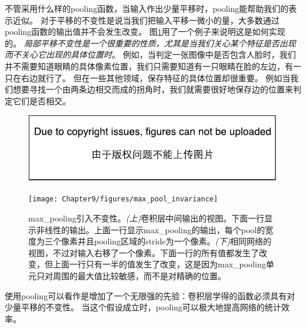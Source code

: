 不管采用什么样的\gls{pooling}函数，当输入作出少量平移时，\gls{pooling}能帮助我们的表示近似。
对于平移的不变性是说当我们把输入平移一微小的量，大多数通过\gls{pooling}函数的输出值并不会发生改变。
图\ref{fig:chap9_max_pool_invariance}用了一个例子来说明这是如何实现的。
\emph{局部平移不变性是一个很重要的性质，尤其是当我们关心某个特征是否出现而不关心它出现的具体位置时}。
例如，当判定一张图像中是否包含人脸时，我们并不需要知道眼睛的具体像素位置，我们只需要知道有一只眼睛在脸的左边，有一只在右边就行了。
但在一些其他领域，保存特征的具体位置却很重要。
例如当我们想要寻找一个由两条边相交而成的拐角时，我们就需要很好地保存边的位置来判定它们是否相交。
\begin{figure}[!htb]
\ifOpenSource
\centerline{\includegraphics{figure.pdf}}
\else
\centerline{\texttt{[image: Chapter9/figures/max\_pool\_invariance]}}
\fi
\caption{\gls{max_pooling}引入不变性。\emph{(上)}卷积层中间输出的视图。下面一行显示非线性的输出。上面一行显示\gls{max_pooling}的输出，每个\gls{pool}的宽度为三个像素并且\gls{pooling}区域的\gls{stride}为一个像素。\emph{(下)}相同网络的视图，不过对输入右移了一个像素。下面一行的所有值都发生了改变，但上面一行只有一半的值发生了改变，这是因为\gls{max_pooling}单元只对周围的最大值比较敏感，而不是对精确的位置。}
\label{fig:chap9_max_pool_invariance}
\end{figure}

 
使用\gls{pooling}可以看作是增加了一个无限强的先验：卷积层学得的函数必须具有对少量平移的不变性。
当这个假设成立时，\gls{pooling}可以极大地提高网络的统计效率。

